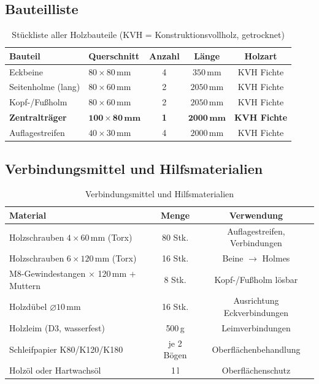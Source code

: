 ﻿\documentclass[12pt,a4paper]{article}
\theoremstyle{definition}
\theoremstyle{plain}
\theoremstyle{remark}
\begin{document}
\subsection{Bauteilliste}

\begin{table}[H]
\centering
\begin{tabular}{llccc}
\toprule
\textbf{Bauteil} & \textbf{Querschnitt} & \textbf{Anzahl} & \textbf{Länge} & \textbf{Holzart}\\
\midrule
Eckbeine           & $80 \times 80\,\text{mm}$  & 4 & $350\,\text{mm}$ & KVH Fichte \\
Seitenholme (lang) & $80 \times 60\,\text{mm}$  & 2 & $2050\,\text{mm}$ & KVH Fichte \\
Kopf-/Fußholm      & $80 \times 60\,\text{mm}$  & 2 & $2050\,\text{mm}$ & KVH Fichte \\
\textbf{Zentralträger}  & $\mathbf{100 \times 80\,\text{mm}}$ & \textbf{1} & $\mathbf{2000\,\text{mm}}$ & \textbf{KVH Fichte} \\
Auflagestreifen    & $40 \times 30\,\text{mm}$  & 4 & $2000\,\text{mm}$ & KVH Fichte \\
\bottomrule
\end{tabular}
\caption{Stückliste aller Holzbauteile (KVH = Konstruktionsvollholz, getrocknet)}
\end{table}

\subsection{Verbindungsmittel und Hilfsmaterialien}

\begin{table}[H]
\centering
\begin{tabular}{lcc}
\toprule
\textbf{Material} & \textbf{Menge} & \textbf{Verwendung}\\
\midrule
Holzschrauben $4 \times 60\,\text{mm}$ (Torx)  & 80 Stk. & Auflagestreifen, Verbindungen \\
Holzschrauben $6 \times 120\,\text{mm}$ (Torx) & 16 Stk. & Beine $\to$ Holmes \\
M8-Gewindestangen $\times$ 120\,mm + Muttern     &  8 Stk. & Kopf-/Fußholm lösbar \\
Holzdübel $\varnothing 10\,\text{mm}$            & 16 Stk. & Ausrichtung Eckverbindungen\\
Holzleim (D3, wasserfest)                        & 500\,g   & Leimverbindungen \\
Schleifpapier K80/K120/K180                      & je 2 Bögen & Oberflächenbehandlung \\
Holzöl oder Hartwachsöl                         & 1\,l     & Oberflächenschutz \\
\bottomrule
\end{tabular}
\caption{Verbindungsmittel und Hilfsmaterialien}
\end{table}
\end{document}
